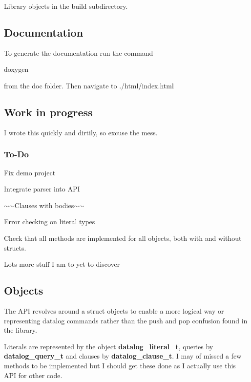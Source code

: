 Library objects in the build subdirectory.

\subsection*{Documentation}

To generate the documentation run the command


\begin{DoxyCode}
doxygen
\end{DoxyCode}
 from the doc folder. Then navigate to ./html/index.html

\subsection*{Work in progress}

I wrote this quickly and dirtily, so excuse the mess.

\subsubsection*{To-\/\+Do}


\begin{DoxyItemize}
\item Fix demo project
\item Integrate parser into A\+PI
\item $\sim$$\sim$\+Clauses with bodies$\sim$$\sim$
\item Error checking on literal types
\item Check that all methods are implemented for all objects, both with and without structs.
\item Lots more stuff I am to yet to discover
\end{DoxyItemize}

\subsection*{Objects}

The A\+PI revolves around a struct objects to enable a more logical way or representing datalog commands rather than the push and pop confusion found in the library.

Literals are represented by the object {\bfseries datalog\+\_\+literal\+\_\+t}, queries by {\bfseries datalog\+\_\+query\+\_\+t} and clauses by {\bfseries datalog\+\_\+clause\+\_\+t}. I may of missed a few methods to be implemented but I should get these done as I actually use this A\+PI for other code.

